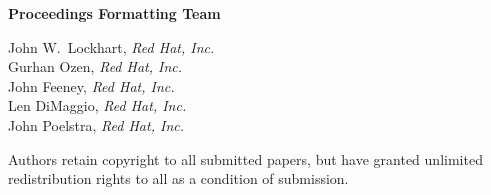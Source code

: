 \documentclass[twoside,12pt]{book}
\begin{document}
\vspace{1cm}

\textbf{{\Large Proceedings Formatting Team}}

\vspace{5mm}
\begin{large}
\begin{raggedright}
\hspace*{0.5in}John W.\ Lockhart, \textit{Red Hat, Inc.}\\
\hspace*{0.5in}Gurhan Ozen, \textit{Red Hat, Inc.}\\
\hspace*{0.5in}John Feeney, \textit{Red Hat, Inc.}\\
\hspace*{0.5in}Len DiMaggio, \textit{Red Hat, Inc.}\\
\hspace*{0.5in}John Poelstra, \textit{Red Hat, Inc.}\\
\end{raggedright}
\end{large}

\vspace{3.0in}

\vspace*{\fill}

\begin{center}
Authors retain copyright to all submitted papers, but have granted 
unlimited redistribution rights to all as a condition of submission.
\end{center}
\cleardoublepage
\end{document}
